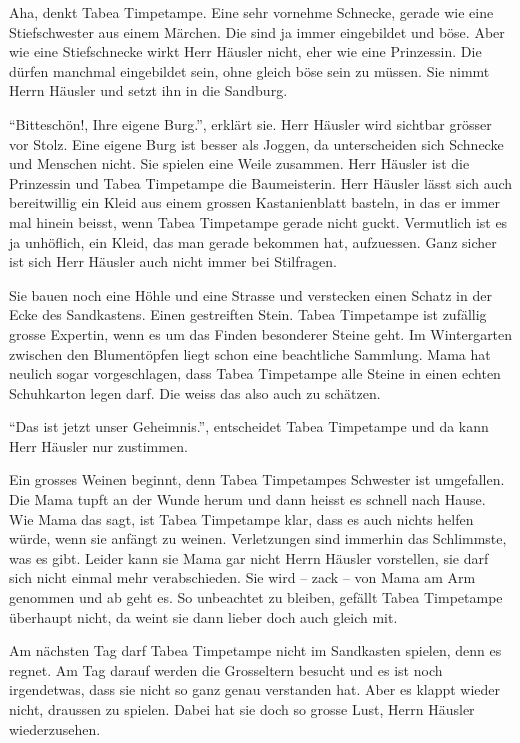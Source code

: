Aha, denkt Tabea Timpetampe. Eine sehr vornehme Schnecke, gerade wie eine Stiefschwester aus einem Märchen. Die sind ja immer eingebildet und böse. Aber wie eine Stiefschnecke wirkt Herr Häusler nicht, eher wie eine Prinzessin. Die dürfen manchmal eingebildet sein, ohne gleich böse sein zu müssen. Sie nimmt Herrn Häusler und setzt ihn in die Sandburg.

\enquote{Bitteschön!, Ihre eigene Burg.}, erklärt sie. Herr Häusler wird sichtbar grösser vor Stolz. Eine eigene Burg ist besser als Joggen, da unterscheiden sich Schnecke und Menschen nicht. Sie spielen eine Weile zusammen. Herr Häusler ist die Prinzessin und Tabea Timpetampe die Baumeisterin. Herr Häusler lässt sich auch bereitwillig ein Kleid aus einem grossen Kastanienblatt basteln, in das er immer mal hinein beisst, wenn Tabea Timpetampe gerade nicht guckt. Vermutlich ist es ja unhöflich, ein Kleid, das man gerade bekommen hat, aufzuessen. Ganz sicher ist sich Herr Häusler auch nicht immer bei Stilfragen.

Sie bauen noch eine Höhle und eine Strasse und verstecken einen Schatz in der Ecke des Sandkastens. Einen gestreiften Stein. Tabea Timpetampe ist zufällig grosse Expertin, wenn es um das Finden besonderer Steine geht. Im Wintergarten zwischen den Blumentöpfen liegt schon eine beachtliche Sammlung. Mama hat neulich sogar vorgeschlagen, dass Tabea Timpetampe alle Steine in einen echten Schuhkarton legen darf. Die weiss das also auch zu schätzen.

\enquote{Das ist jetzt unser Geheimnis.}, entscheidet Tabea Timpetampe und da kann Herr Häusler nur zustimmen. 

Ein grosses Weinen beginnt, denn Tabea Timpetampes Schwester ist umgefallen. Die Mama tupft an der Wunde herum und dann heisst es schnell nach Hause. Wie Mama das sagt, ist Tabea Timpetampe klar, dass es auch nichts helfen würde, wenn sie anfängt zu weinen. Verletzungen sind immerhin das Schlimmste, was es gibt. Leider kann sie Mama gar nicht Herrn Häusler vorstellen, sie darf sich nicht einmal mehr verabschieden. Sie wird -- zack -- von Mama am Arm genommen und ab geht es. So unbeachtet zu bleiben, gefällt Tabea Timpetampe überhaupt nicht, da weint sie dann lieber doch auch gleich mit.

Am nächsten Tag darf Tabea Timpetampe nicht im Sandkasten spielen, denn es regnet. Am Tag darauf werden die Grosseltern besucht und es ist noch irgendetwas, dass sie nicht so ganz genau verstanden hat. Aber es klappt wieder nicht, draussen zu spielen. Dabei hat sie doch so grosse Lust, Herrn Häusler wiederzusehen. 

